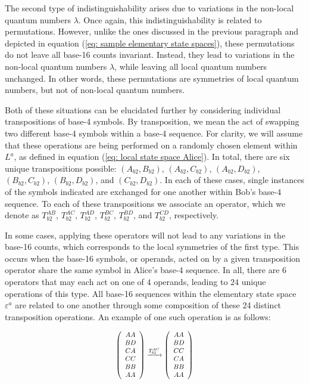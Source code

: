 \documentclass{article}
\begin{document}
The second type of indistinguishability arises due to variations in the non-local quantum numbers $\lambda$. Once again, this indistinguishability is related to permutations. However, unlike the ones discussed in the previous paragraph and depicted in equation (\ref{eq: sample elementary state spaces}), these permutations do not leave all base-16 counts invariant. Instead, they lead to variations in the non-local quantum numbers $\lambda$, while leaving all local quantum numbers unchanged. In other words, these permutations are symmetries of local quantum numbers, but not of non-local quantum numbers. 

Both of these situations can be elucidated further by considering individual transpositions of base-4 symbols. By transposition, we mean the act of swapping two different base-4 symbols within a base-4 sequence. For clarity, we will assume that these operations are being performed on a randomly chosen element within $L^a$, as defined in equation (\ref{eq: local state space Alice}). In total, there are six unique transpositions possible: $(A_{b2},B_{b2})$, $(A_{b2},C_{b2})$, $(A_{b2},D_{b2})$, $(B_{b2},C_{b2})$, $(B_{b2},D_{b2})$, and $(C_{b2},D_{b2})$. In each of these cases, single instances of the symbols indicated are exchanged for one another within Bob's base-4 sequence. To each of these transpositions we associate an operator, which we denote as $T^{AB}_{b2}$, $T^{AC}_{b2}$, $T^{AD}_{b2}$, $T^{BC}_{b2}$, $T^{BD}_{b2}$, and $T^{CD}_{b2}$, respectively.

In some cases, applying these operators will not lead to any variations in the base-16 counts, which corresponds to the local symmetries of the first type. This occurs when the base-16 symbols, or operands, acted on by a given transposition operator share the same symbol in Alice's base-4 sequence. In all, there are $6$ operators that may each act on one of $4$ operands, leading to $24$ unique operations of this type. All base-16 sequences within the elementary state space $\varepsilon^a$ are related to one another through some composition of these 24 distinct transposition operations. An example of one such operation is as follows:

\begin{equation}
\scalebox{0.8}{$\begin{aligned}
\left(\begin{array}{c}
AA\\
BD\\
CA\\
CC\\
BB\\
AA
\end{array}\right)\xrightarrow{T^{AC}_{b2}}\left(\begin{array}{c}
AA\\
BD\\
CC\\
CA\\
BB\\
AA
\end{array}\right)
\end{aligned}$}
\label{eq: transpostion 1}
\end{equation}
\end{document}
